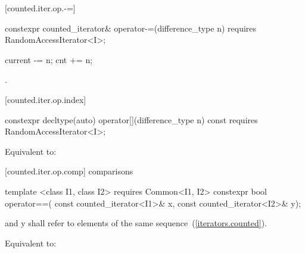 [counted.iter.op.-=]{}

%
%
\begin{itemdecl}
  constexpr counted_iterator& operator-=(difference_type n)
    requires RandomAccessIterator<I>;
\end{itemdecl}

\begin{itemdescr}
\pnum
\requires {}

\pnum
\effects
\begin{codeblock}
current -= n;
cnt += n;
\end{codeblock}

\pnum
\returns {}.
\end{itemdescr}

[counted.iter.op.index]{}

%
%
\begin{itemdecl}
  constexpr decltype(auto) operator[](difference_type n) const
    requires RandomAccessIterator<I>;
\end{itemdecl}

\begin{itemdescr}
\pnum
\requires {}

\pnum
\effects Equivalent to:
\end{itemdescr}

[counted.iter.op.comp]{ comparisons}

%
%
\begin{itemdecl}
template <class I1, class I2>
    requires Common<I1, I2>
  constexpr bool operator==(
    const counted_iterator<I1>& x, const counted_iterator<I2>& y);
\end{itemdecl}

\begin{itemdescr}
\pnum
\requires {} and {y} shall refer to elements of the same
sequence~(\ref{iterators.counted}).

\pnum
\effects Equivalent to:
\end{itemdescr}

